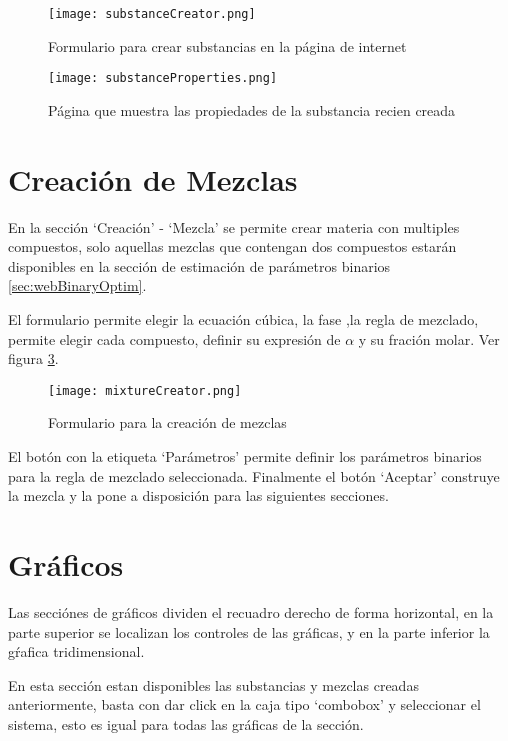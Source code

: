 	\begin{figure}[H]
		\texttt{[image: substanceCreator.png]}
		\caption{Formulario para crear substancias en la página de internet}
		\label{fig:substanceCreator}
	\end{figure}

	\begin{figure}[H]
		\texttt{[image: substanceProperties.png]}
		\caption{Página que muestra las propiedades de la substancia recien creada}
		\label{fig:substanceProperties}
	\end{figure}

\section{Creación de Mezclas}\label{sec:webMixtureCreator}

	En la sección `Creación' - `Mezcla' se permite crear materia con multiples compuestos, solo aquellas mezclas que contengan dos compuestos estarán disponibles en la sección de estimación de parámetros binarios \ref{sec:webBinaryOptim}.

	El formulario permite elegir la ecuación cúbica, la fase ,la regla de mezclado, permite elegir cada compuesto, definir su expresión de $\alpha$ y su fración molar. Ver figura \ref{fig:webMixCreator}.

	\begin{figure}[H]
		\texttt{[image: mixtureCreator.png]}
		\caption{Formulario para la creación de mezclas}
		\label{fig:webMixCreator}
	\end{figure}

	El botón con la etiqueta `Parámetros' permite definir los parámetros binarios para la regla de mezclado seleccionada. Finalmente el botón `Aceptar' construye la mezcla y la pone a disposición para las siguientes secciones.

\section{Gráficos}

	Las secciónes de gráficos dividen el recuadro derecho de forma horizontal, en la parte superior se localizan los controles de las gráficas, y en la parte inferior la gŕafica tridimensional.

	En esta sección estan disponibles las substancias y mezclas creadas anteriormente, basta con dar click en la caja tipo `combobox' y seleccionar el sistema, esto es igual para todas las gráficas de la sección.


